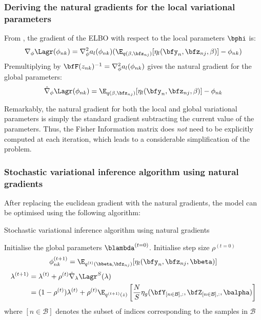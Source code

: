 \subsubsection{Deriving the natural gradients for the local variational parameters}

From , the gradient of the ELBO with respect to the local parameters $\bphi$ is:
\[
	\nabla_{\phi} \Lagr(\phi_{nk}) = \nabla_{\phi}^2 a_l(\phi_{nk}) (\E_{q(\beta,\bfz_{nj})}[\eta_l(\bfy_n,\bfz_{nj},\beta)] - \phi_{nk})
\]
Premultiplying by $\bfF(z_{nk})^{-1}=\nabla_{\phi}^{2} a_l(\phi_{nk})$ gives the natural gradient for the global parameters:
\[
	\hat{\nabla}_{\phi} \Lagr(\phi_{nk}) = \E_{q(\beta,\bfz_{nj})}[\eta_l(\bfy_n,\bfz_{nj},\beta)] - \phi_{nk}
\]

Remarkably, the natural gradient for both the local and global variational parameters is simply the standard gradient subtracting the current value of the parameters. Thus, the Fisher Information matrix does \textit{not} need to be explicitly computed at each iteration, which leads to a considerable simplification of the problem. 


\subsubsection{Stochastic variational inference algorithm using natural gradients}

After replacing the euclidean gradient with the natural gradients, the model can be optimised using the following algorithm: 

\begin{algorithm}[H]
  \caption{Stochastic variational inference algorithm using natural gradients}
  \begin{algorithmic}[1]
	\State Initialise the global parameters $\blambda^{(t=0)}$.
	\State Initialise step size $\rho^{(t=0)}$
	\Repeat
	    \State {}
			\State $$ \phi_{nk}^{(t+1)} = \E_{q^{(t)}(\bbeta,\bfz_{nj})}[\eta_l(\bfy_{n},\bfz_{nj},\bbeta)] $$
      	\EndFor
		     \State
        		\begin{align} \label{eq_elbo_factorised} \begin{split}
            	\lambda^{(t + 1)} &=  \lambda^{(t)} +  \rho ^{(t)} \hat{\nabla}_{\lambda} \Lagr^S(\lambda) \\
            	 &=  (1-\rho ^{(t)})\lambda^{(t)} +  \rho ^{(t)} \E_{q^{(t+1)}(z)}\left[\frac{N}{S}\eta_g(\bfY_{[n \in \mathcal{B}],:},\bfZ_{[n \in \mathcal{B}],:},\balpha)\right]
            \end{split} \end{align}
            \State where $[n \in \mathcal{B}]$ denotes the subset of indices corresponding to the samples in $\mathcal{B}$
      	\EndFor
	\end{algorithmic}
\end{algorithm}

